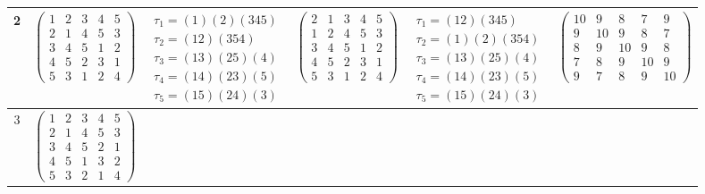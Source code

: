 \begin{longtable}{|c|p{2.7cm}|p{2.7cm}|p{2.7cm}|p{2.7cm}|p{3.3cm}|}
    \hline
    2                                                                                                                                           &
    $\begin{pmatrix}1&2&3&4&5\\2&1&4&5&3\\3&4&5&1&2\\4&5&2&3&1\\5&3&1&2&4\end{pmatrix}$                                                         &
    $\begin{array}{l}\tau_{1}=(1)(2)(345)\\ \tau_{2}=(12)(354)\\ \tau_{3}=(13)(25)(4)\\ \tau_{4}=(14)(23)(5)\\ \tau_{5}=(15)(24)(3)\end{array}$ &
    $\begin{pmatrix}2&1&3&4&5\\1&2&4&5&3\\3&4&5&1&2\\4&5&2&3&1\\5&3&1&2&4\end{pmatrix}$                                                         &
    $\begin{array}{l}\tau_{1}=(12)(345)\\ \tau_{2}=(1)(2)(354)\\ \tau_{3}=(13)(25)(4)\\ \tau_{4}=(14)(23)(5)\\ \tau_{5}=(15)(24)(3)\end{array}$ &
    $\begin{pmatrix}10&9&8&7&9\\9&10&9&8&7\\8&9&10&9&8\\7&8&9&10&9\\9&7&8&9&10\end{pmatrix}$                                                                                                                                \\
    \hline
    3                                                                                                                                           &
    $\begin{pmatrix}1&2&3&4&5\\2&1&4&5&3\\3&4&5&2&1\\4&5&1&3&2\\5&3&2&1&4\end{pmatrix}$                                                         &

\end{longtable}

